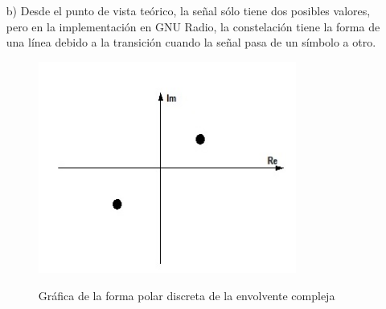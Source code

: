  \begin{itemize}
 \item[b)] Desde el punto de vista teórico, la señal sólo tiene dos posibles valores, pero en la implementación en GNU Radio, la constelación tiene la forma de una línea debido a la transición cuando la señal pasa de un símbolo a otro.

\vspace{200px} 
 \begin{figure}[h!]
	\captionsetup{justification = raggedright, singlelinecheck = false}
    \caption{Gráfica de la forma polar discreta de la envolvente compleja}
    \centering
    \includegraphics[width=0.8\textwidth]{Imagenes/imagen1.jpg}
    \label{fig:imagen1}
\end{figure}

 \end{itemize}
 
